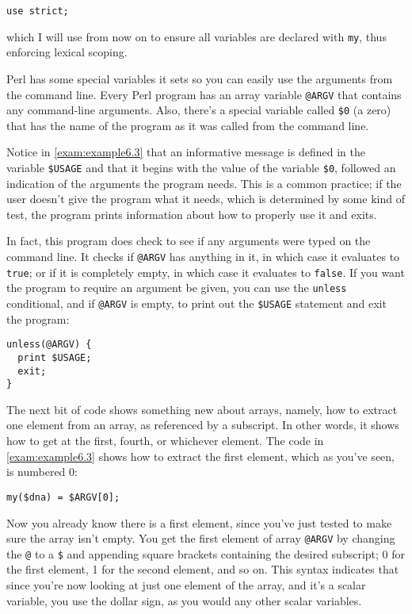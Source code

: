 \begin{lstlisting}
use strict;
\end{lstlisting}

which I will use from now on to ensure all variables are declared with \verb|my|, thus enforcing lexical scoping.

Perl has some special variables it sets so you can easily use the arguments from the command line. Every Perl program has an array variable \verb|@ARGV| that contains any command-line arguments. Also, there's a special variable called \verb|$0| (a zero) that has the name of the program as it was called from the command line.

Notice in \autoref{exam:example6.3} that an informative message is defined in the variable \verb|$USAGE| and that it begins with the value of the variable \verb|$0|, followed an indication of the arguments the program needs. This is a common practice; if the user doesn't give the program what it needs, which is determined by some kind of test, the program prints information about how to properly use it and exits.

In fact, this program does check to see if any arguments were typed on the command line. It checks if \verb|@ARGV| has anything in it, in which case it evaluates to \verb|true|; or if it is completely empty, in which case it evaluates to \verb|false|. If you want the program to require an argument be given, you can use the \verb|unless| conditional, and if \verb|@ARGV| is empty, to print out the \verb|$USAGE| statement and exit the program: 

\begin{lstlisting}
unless(@ARGV) {
  print $USAGE;
  exit;
}
\end{lstlisting}

The next bit of code shows something new about arrays, namely, how to extract one element from an array, as referenced by a subscript. In other words, it shows how to get at the first, fourth, or whichever element. The code in \autoref{exam:example6.3} shows how to extract the first element, which as you've seen, is numbered 0:

\begin{lstlisting}
my($dna) = $ARGV[0];
\end{lstlisting}

Now you already know there is a first element, since you've just tested to make sure the array isn't empty. You get the first element of array \verb|@ARGV| by changing the \verb|@| to a \verb|$| and appending square brackets containing the desired subscript; 0 for the first element, 1 for the second element, and so on. This syntax indicates that since you're now looking at just one element of the array, and it's a scalar variable, you use the dollar sign, as you would any other scalar variables.

